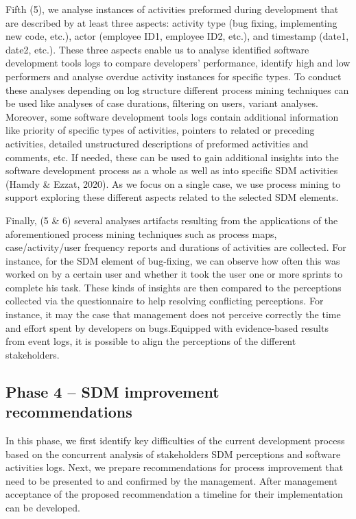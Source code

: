 Fifth (5), we analyse instances of activities preformed during development that are described
by at least three aspects: activity type (bug fixing, implementing new code, etc.), actor (employee
ID1, employee ID2, etc.), and timestamp (date1, date2, etc.). These three aspects enable us to
analyse identified software development tools logs to compare developers’ performance, identify
high and low performers and analyse overdue activity instances for specific types. To conduct these
analyses depending on log structure different process mining techniques can be used like analyses of
case durations, filtering on users, variant analyses. Moreover, some software development tools logs
contain additional information like priority of specific types of activities, pointers to related or
preceding activities, detailed unstructured descriptions of preformed activities and comments, etc. If
needed, these can be used to gain additional insights into the software development process as a
whole as well as into specific SDM activities (Hamdy \& Ezzat, 2020). As we focus on a single case, we
use process mining to support exploring these different aspects related to the selected SDM
elements.

Finally, (5 \& 6) several analyses artifacts resulting from the applications of the
aforementioned process mining techniques such as process maps, case/activity/user frequency
reports and durations of activities are collected. For instance, for the SDM element of bug-fixing, we
can observe how often this was worked on by a certain user and whether it took the user one or
more sprints to complete his task. These kinds of insights are then compared to the perceptions
collected via the questionnaire to help resolving conflicting perceptions. For instance, it may the case
that management does not perceive correctly the time and effort spent by developers on bugs.Equipped with evidence-based results from event logs, it is possible to align the perceptions of the
different stakeholders.


\subsection{Phase 4 – SDM improvement recommendations}
In this phase, we first identify key difficulties of the current development process based on the concurrent analysis of stakeholders SDM perceptions and software activities logs. Next, we prepare recommendations for process improvement that need to be presented to and confirmed by the management. After management acceptance of the proposed recommendation a timeline for their implementation can be developed. 

